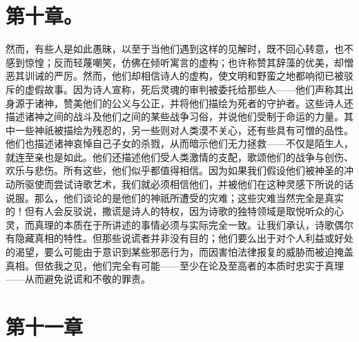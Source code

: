 
\section{第十章。}

然而，有些人是如此愚昧，以至于当他们遇到这样的见解时，既不回心转意，也不感到惊惶；反而轻蔑嘲笑，仿佛在倾听寓言的虚构；也许称赞其辞藻的优美，却憎恶其训诫的严厉。然而，他们却相信诗人的虚构，使文明和野蛮之地都响彻已被驳斥的虚假故事。因为诗人宣称，死后灵魂的审判被委托给那些人——他们声称其出身源于诸神，赞美他们的公义与公正，并将他们描绘为死者的守护者。这些诗人还描述诸神之间的战斗及他们之间的某些战争习俗，并说他们受制于命运的力量。其中一些神祇被描绘为残忍的，另一些则对人类漠不关心，还有些具有可憎的品性。他们也描述诸神哀悼自己子女的杀戮，从而暗示他们无力拯救——不仅是陌生人，就连至亲也是如此。他们还描述他们受人类激情的支配，歌颂他们的战争与创伤、欢乐与悲伤。所有这些，他们似乎都值得相信。因为如果我们假设他们被神圣的冲动所驱使而尝试诗歌艺术，我们就必须相信他们，并被他们在这种灵感下所说的话说服。那么，他们谈论的是他们的神祇所遭受的灾难；这些灾难当然完全是真实的！但有人会反驳说，撒谎是诗人的特权，因为诗歌的独特领域是取悦听众的心灵，而真理的本质在于所讲述的事情必须与实际完全一致。让我们承认，诗歌偶尔有隐藏真相的特性。但那些说谎者并非没有目的；他们要么出于对个人利益或好处的渴望，要么可能由于意识到某些邪恶行为，而因害怕法律报复的威胁而被迫掩盖真相。但依我之见，他们完全有可能——至少在论及至高者的本质时忠实于真理——从而避免说谎和不敬的罪责。\par


\section{第十一章 }

